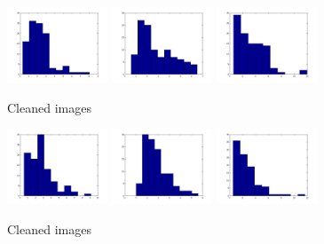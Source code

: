 \documentclass[10pt,a4paper,oneclumn]{article}
\begin{document}
\begin{figure}[h!]
\centering
  \includegraphics[width=3cm]{redHist.jpg}
  \includegraphics[width=3cm]{greenHist.jpg}
  \includegraphics[width=3cm]{yellowHist.jpg}
\caption{Cleaned images}
\end{figure}

\begin{figure}[h!]
\centering
  \includegraphics[width=3cm]{redHistBound.jpg}
  \includegraphics[width=3cm]{greenHistBound.jpg}
  \includegraphics[width=3cm]{yellowHistBound.jpg}
\caption{Cleaned images}
\end{figure}
\end{document}
